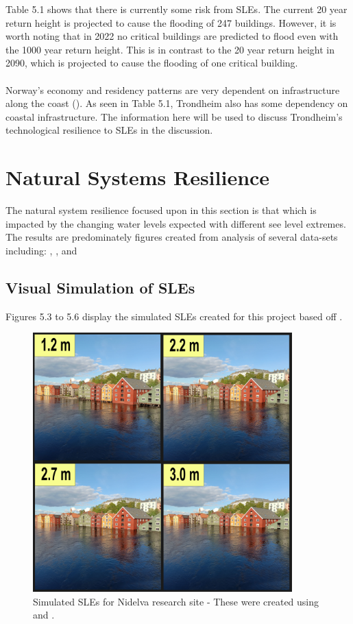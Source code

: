 Table 5.1 shows that there is currently some risk from SLEs. The current 20 year return height is projected to cause the flooding of 247 buildings. However, it is worth noting that in 2022 no critical buildings are predicted to flood even with the 1000 year return height. This is in contrast to the 20 year return height in 2090, which is projected to cause the flooding of one critical building.
\paragraph{}

Norway's economy and residency patterns are very dependent on infrastructure along the coast (\cite{aunan_strong_2008}). As seen in Table 5.1, Trondheim also has some dependency on coastal infrastructure. The information here will be used to discuss Trondheim's technological resilience to SLEs in the discussion. 


\section{Natural Systems Resilience}
The natural system resilience focused upon in this section is that which is impacted by the changing water levels expected with different see level extremes. The results are predominately figures created from analysis of several  data-sets including: \cite{geonorge_stormflo_nodate} , \cite{kartverket_se_2021}, \cite{stormflo_database_stormflo_2021} and \cite{ipcc_sea_2021}

\subsection{Visual Simulation of SLEs}
 Figures 5.3 to 5.6 display the simulated SLEs created for this project based off \cite{kartverket_se_2020}.

\begin{figure}[H]
    \centering
    \includegraphics[width=10cm]{fig_sle/nidelva 2090 q.png}
    \caption{Simulated SLEs for Nidelva research site - These were created using \cite{kartverket_se_2021} and \cite{stormflo_database_stormflo_2021}. }
    \label{fig:SLE-nidelva}
\end{figure}

